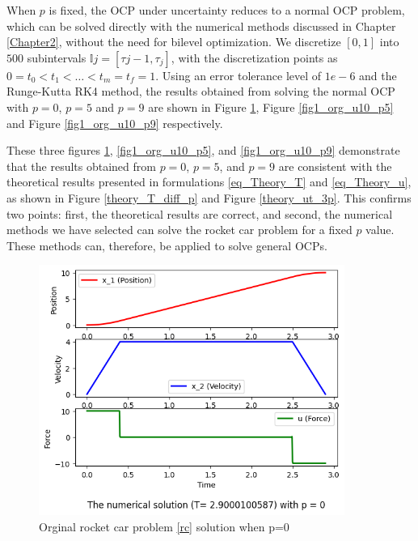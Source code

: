 \documentclass  [
  paper    = a4,
  BCOR     = 10mm,
  twoside,
  fontsize = 12pt,
  fleqn,
  toc      = bibnumbered,
  toc      = listofnumbered,
  numbers  = noendperiod,
  headings = normal,
  listof   = leveldown,
  version  = 3.03
]                                       {scrreprt}
\newcommand{\<}{\langle}
\renewcommand{\>}{\rangle}
\begin{document}
When $p$ is fixed, the OCP under uncertainty reduces to a normal OCP problem, which can be solved directly with the numerical methods discussed in Chapter \ref{Chapter2}, without the need for bilevel optimization. We discretize $[0,1]$ into $500$ subintervals $\mathbb{I}j = [\tau{j-1}, \tau_j]$, with the discretization points as $0 = t_0 < t_1 < \dots < t_m = t_f = 1$. Using an error tolerance level of $1e-6$ and the Runge-Kutta RK4 method, the results obtained from solving the normal OCP with $p=0$, $p=5$ and $p=9$ are shown in Figure \ref{fig1_org_u10_p0}, Figure \ref{fig1_org_u10_p5} and Figure \ref{fig1_org_u10_p9} respectively.

These three figures \ref{fig1_org_u10_p0}, \ref{fig1_org_u10_p5}, and \ref{fig1_org_u10_p9} demonstrate that the results obtained from $p=0$, $p=5$, and $p=9$ are consistent with the theoretical results presented in formulations \ref{eq_Theory_T} and \ref{eq_Theory_u}, as shown in Figure \ref{theory_T_diff_p} and Figure \ref{theory_ut_3p}. This confirms two points: first, the theoretical results are correct, and second, the numerical methods we have selected can solve the rocket car problem for a fixed $p$ value. These methods can, therefore, be applied to solve general OCPs.


\begin{figure}[H]
	\centerline{\includegraphics[width=10cm]{original_u10_p0.png}}
	\caption{Orginal rocket car problem \ref{rc} solution when p=0}
	\label{fig1_org_u10_p0}
\end{figure}
\end{document}
